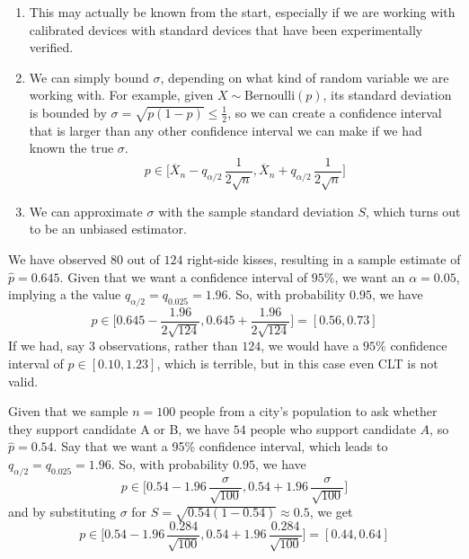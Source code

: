 \documentclass{article}
\begin{document}
    \begin{enumerate}
      \item This may actually be known from the start, especially if we are working with calibrated devices with standard devices that have been experimentally verified.

      \item We can simply bound $\sigma$, depending on what kind of random variable we are working with. For example, given $X \sim \mathrm{Bernoulli}(p)$, its standard deviation is bounded by $\sigma = \sqrt{p (1 - p)} \leq \frac{1}{2}$, so we can create a confidence interval that is larger than any other confidence interval we can make if we had known the true $\sigma$. 
      \begin{equation}
        p \in \bigg[ \overline{X}_n - q_{\alpha/2} \, \frac{1}{2 \sqrt{n}}, \overline{X}_n + q_{\alpha/2} \,\frac{1}{2 \sqrt{n}} \bigg]
      \end{equation}

      \item We can approximate $\sigma$ with the sample standard deviation $S$, which turns out to be an unbiased estimator. 
    \end{enumerate}

    \begin{example}
      We have observed $80$ out of $124$ right-side kisses, resulting in a sample estimate of $\widehat{p} = 0.645$. Given that we want a confidence interval of $95\%$, we want an $\alpha = 0.05$, implying a the value $q_{\alpha/2} = q_{0.025} = 1.96$. So, with probability $0.95$, we have 
      \begin{equation}
        p \in \bigg[ 0.645 - \frac{1.96}{2 \sqrt{124}}, 0.645 + \frac{1.96}{2 \sqrt{124}} \bigg] = [ 0.56, 0.73 ]
      \end{equation}
      If we had, say $3$ observations, rather than $124$, we would have a $95\%$ confidence interval of $p \in [0.10, 1.23]$, which is terrible, but in this case even CLT is not valid. 
    \end{example}

    \begin{example}
      Given that we sample $n = 100$ people from a city's population to ask whether they support candidate A or B, we have $54$ people who support candidate $A$, so $\widehat{p} = 0.54$. Say that we want a 95\% confidence interval, which leads to $q_{\alpha /2} = q_{0.025} = 1.96$. So, with probability $0.95$, we have 
      \begin{equation}
        p \in \bigg[ 0.54 - 1.96\,\frac{\sigma}{\sqrt{100}}, 0.54 + 1.96\,\frac{\sigma}{\sqrt{100}} \bigg]
      \end{equation}
      and by substituting $\sigma$ for $S = \sqrt{0.54 (1 - 0.54)} \approx 0.5$, we get 
      \begin{equation}
        p \in \bigg[ 0.54 - 1.96\,\frac{0.284}{\sqrt{100}}, 0.54 + 1.96\,\frac{0.284}{\sqrt{100}} \bigg] = [0.44, 0.64]
      \end{equation}
    \end{example}
\end{document}
